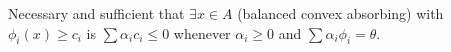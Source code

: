 Necessary and sufficient that $\exists x\in A$ (balanced convex absorbing) with $\phi_i(x)\geqslant c_i$ is $\sum\alpha_i c_i\leqslant0$ whenever $\alpha_i\geqslant0$ and $\sum\alpha_i\phi_i=\theta$.
